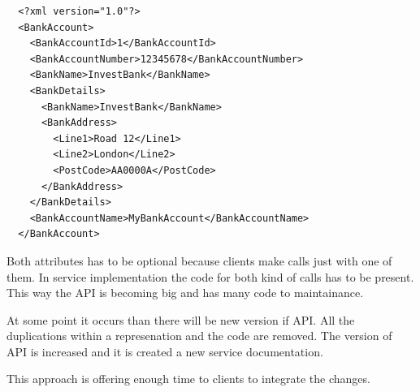 \begin{lstlisting}
  <?xml version="1.0"?>
  <BankAccount>
    <BankAccountId>1</BankAccountId>
    <BankAccountNumber>12345678</BankAccountNumber>
    <BankName>InvestBank</BankName>
    <BankDetails>
      <BankName>InvestBank</BankName>
      <BankAddress>
        <Line1>Road 12</Line1>
        <Line2>London</Line2>
        <PostCode>AA0000A</PostCode>
      </BankAddress>
    </BankDetails>
    <BankAccountName>MyBankAccount</BankAccountName>
  </BankAccount>
\end{lstlisting}

Both attributes has to be optional because clients make calls just with one of them. In service implementation the code for both kind of calls has to be present. This way the API is becoming big and has many code to maintainance. 

At some point it occurs than there will be new version if API. All the duplications within a represenation and the code are removed. The version of API is increased and it is created a new service documentation.

This approach is offering enough time to clients to integrate the changes. 













